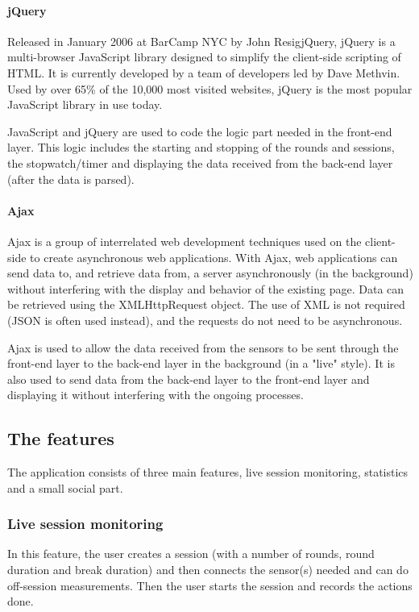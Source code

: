 \documentclass[a4paper]{article}
\begin{document}
\paragraph{jQuery}
Released in January 2006 at BarCamp NYC by John ResigjQuery, jQuery is a multi-browser JavaScript library designed to simplify the client-side scripting of HTML. It is currently developed by a team of developers led by Dave Methvin. Used by over 65\% of the 10,000 most visited websites, jQuery is the most popular JavaScript library in use today.

JavaScript and jQuery are used to code the logic part needed in the front-end layer. This logic includes the starting and stopping of the rounds and sessions, the stopwatch/timer and displaying the data received from the back-end layer (after the data is parsed).

\paragraph{Ajax}
Ajax is a group of interrelated web development techniques used on the client-side to create asynchronous web applications. With Ajax, web applications can send data to, and retrieve data from, a server asynchronously (in the background) without interfering with the display and behavior of the existing page. Data can be retrieved using the XMLHttpRequest object. The use of XML is not required (JSON is often used instead), and the requests do not need to be asynchronous.

Ajax is used to allow the data received from the sensors to be sent through the front-end layer to the back-end layer in the background (in a "live" style). It is also used to send data from the back-end layer to the front-end layer and displaying it without interfering with the ongoing processes.

\subsection{The features}
The application consists of three main features, live session monitoring, statistics and a small social part.

\newpage

\subsubsection{Live session monitoring}
In this feature, the user creates a session (with a number of rounds, round duration and break duration) and then connects the sensor(s) needed and can do off-session measurements. Then the user starts the session and records the actions done.
\end{document}
